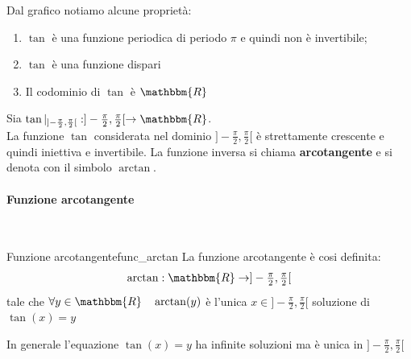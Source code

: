 \documentclass[12pt]{report}
\newcounter{definition}
\newcommand{\nmu}{}
\begin{document}
	Dal grafico notiamo alcune proprietà:
	\begin{enumerate}
		\item $\tan$ è una funzione periodica di periodo $\pi$ e quindi non è invertibile;
		\item $\tan$ è una funzione dispari
		\item Il codominio di $\tan$ è $\mathbbm{R}$
	\end{enumerate}
	Sia $\tan|_{]-\frac{\pi}{2}, \frac{\pi}{2}[}: ]-\frac{\pi}{2}, \frac{\pi}{2}[ \to \mathbbm{R}$. \\
	La funzione $\tan$ considerata nel dominio $]-\frac{\pi}{2}, \frac{\pi}{2}[$ è strettamente crescente e quindi iniettiva e invertibile. La funzione inversa si chiama \textbf{arcotangente} e si denota con il simbolo $\arctan$.
	\paragraph{Funzione arcotangente} \quad \\
	\begin{definition}{\nmu Funzione arcotangente}{func_arctan}
		La funzione arcotangente è cosi definita:
		\[
		\begin{array}{l}
			\arctan: \mathbbm{R} \to ]-\frac{\pi}{2}, \frac{\pi}{2}[
		\end{array}
		\]
		tale che $\forall y \in \mathbbm{R} \quad \arctan(y)$ è l'unica $x \in ]-\frac{\pi}{2}, \frac{\pi}{2}[$ soluzione di $\tan(x)=y$
	\end{definition}
	\begin{note}{}{}
		In generale l'equazione $\tan(x)=y$ ha infinite soluzioni ma è unica in $]-\frac{\pi}{2}, \frac{\pi}{2}[$
	\end{note}
\end{document}
